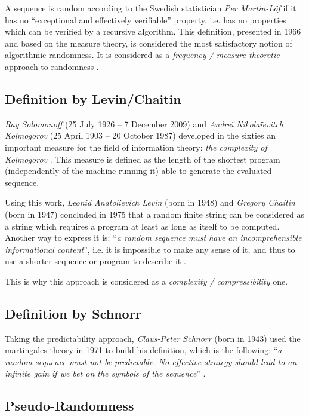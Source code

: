\documentclass{llncs}
\begin{document}
A sequence is random according to the Swedish statistician \emph{Per Martin-L\"{o}f} if it has no ``exceptional and effectively verifiable'' property, i.e. has no properties which can be verified by a recursive algorithm. This definition, presented in 1966 and based on the measure theory, is considered the most satisfactory notion of algorithmic randomness. It is considered as a \textit{frequency / measure-theoretic} approach to randomness \cite{down}.

\subsection{Definition by Levin/Chaitin}

\emph{Ray Solomonoff} (25 July 1926 – 7 December 2009) and \emph{Andreï Nikolaïevitch Kolmogorov} (25 April 1903 – 20 October 1987) developed in the sixties an important measure for the field of information theory: \emph{the complexity of Kolmogorov} \cite{down}. This measure is defined as the length of the shortest program (independently of the machine running it) able to generate the evaluated sequence. 


Using this work, \emph{Leonid Anatolievich Levin} (born in 1948) and \emph{Gregory Chaitin} (born in 1947) concluded in 1975 that a random finite string can be considered as a string which requires a program at least as long as itself to be computed. Another way to express it is: ``\textit{a random sequence must have an incomprehensible informational content}'', i.e. it is impossible to make any sense of it, and thus to use a shorter sequence or program to describe it \cite{down}.

This is why this approach is considered as a \textit{complexity / compressibility} one.

\subsection{Definition by Schnorr}

Taking the predictability approach, \emph{Claus-Peter Schnorr} (born in 1943) used the martingales theory in 1971 to build his definition, which is the following: ``\textit{a random sequence must not be predictable. No effective strategy should lead to an infinite gain if we bet on the symbols of the sequence}'' \cite{down}.



\subsection{Pseudo-Randomness}
\end{document}
